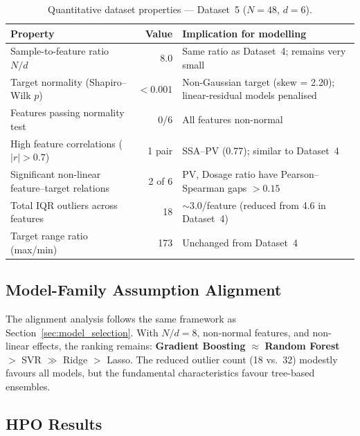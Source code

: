 \documentclass[12pt,a4paper]{article}
\begin{document}
\begin{table}[h]
\centering
\caption{Quantitative dataset properties — Dataset~5 ($N=48$, $d=6$).}
\label{tab:ds5_characteristics}
\small
\begin{tabular}{p{5.5cm}r p{7cm}}
\toprule
Property & Value & Implication for modelling \\
\midrule
Sample-to-feature ratio $N/d$ & 8.0 & Same ratio as Dataset~4; remains very small \\
Target normality (Shapiro--Wilk $p$) & $< 0.001$ & Non-Gaussian target (skew = 2.20); linear-residual models penalised \\
Features passing normality test & 0/6 & All features non-normal \\
High feature correlations ($|r|>0.7$) & 1 pair & SSA--PV (0.77); similar to Dataset~4 \\
Significant non-linear feature--target relations & 2 of 6 & PV, Dosage ratio have Pearson--Spearman gaps $>0.15$ \\
Total IQR outliers across features & 18 & $\sim$3.0/feature (reduced from 4.6 in Dataset~4) \\
Target range ratio (max/min) & 173 & Unchanged from Dataset~4 \\
\bottomrule
\end{tabular}
\end{table}

\subsection{Model-Family Assumption Alignment}

The alignment analysis follows the same framework as
Section~\ref{sec:model_selection}.  With $N/d=8$, non-normal features,
and non-linear effects, the ranking remains: \textbf{Gradient Boosting}
$\approx$ \textbf{Random Forest} $>$ SVR $\gg$ Ridge $>$ Lasso.
The reduced outlier count (18 vs.\ 32) modestly favours all models,
but the fundamental characteristics favour tree-based ensembles.

\subsection{HPO Results}
\label{sec:ds5_hpo}
\end{document}
